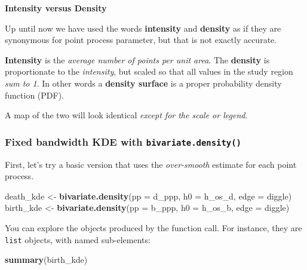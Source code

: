 \documentclass[
]{book}
\newenvironment{Shaded}{\begin{snugshade}}{\end{snugshade}}
\newcommand{\AttributeTok}[1]{\textcolor[rgb]{0.13,0.29,0.53}{#1}}
\newcommand{\FunctionTok}[1]{\textcolor[rgb]{0.13,0.29,0.53}{\textbf{#1}}}
\newcommand{\NormalTok}[1]{#1}
\newcommand{\OtherTok}[1]{\textcolor[rgb]{0.56,0.35,0.01}{#1}}
\newcommand{\StringTok}[1]{\textcolor[rgb]{0.31,0.60,0.02}{#1}}
\newenvironment{rmdnote}[1]
  {
  \begin{itemize}
  \renewcommand{\labelitemi}{
    \raisebox{-.7\height}[0pt][0pt]{
      {\setkeys{Gin}{width=3em,keepaspectratio}\texttt{[image: images/\#1]}}
    }
  }
  \setlength{\fboxsep}{1em}
  \begin{note}
  \item
  }
  {
  \end{note}
  \end{itemize}
  }
\begin{document}
\begin{rmdnote}{note}
\textbf{Intensity versus Density}

Up until now we have used the words \textbf{intensity} and \textbf{density} as if they are synonymous for point process parameter, but that is not exactly accurate.

\textbf{Intensity} is the \emph{average number of points per unit area}. The \textbf{density} is proportionate to the \emph{intensity}, but scaled so that all values in the study region \emph{sum to 1}. In other words a \textbf{density surface} is a proper probability density function (PDF).

A map of the two will look identical \emph{except for the scale or legend}.

\end{rmdnote}

\hypertarget{fixed-bandwidth-kde-with-bivariate.density}{%
\subsubsection{\texorpdfstring{Fixed bandwidth KDE with \texttt{bivariate.density()}}{Fixed bandwidth KDE with bivariate.density()}}\label{fixed-bandwidth-kde-with-bivariate.density}}

First, let's try a basic version that uses the \emph{over-smooth} estimate for each point process.

\begin{Shaded}
\begin{Highlighting}[]
\NormalTok{death\_kde }\OtherTok{\textless{}{-}} \FunctionTok{bivariate.density}\NormalTok{(}\AttributeTok{pp =}\NormalTok{ d\_ppp, }\AttributeTok{h0 =}\NormalTok{ h\_os\_d, }\AttributeTok{edge =} \StringTok{\textquotesingle{}diggle\textquotesingle{}}\NormalTok{)}
\NormalTok{birth\_kde }\OtherTok{\textless{}{-}} \FunctionTok{bivariate.density}\NormalTok{(}\AttributeTok{pp =}\NormalTok{ b\_ppp, }\AttributeTok{h0 =}\NormalTok{ h\_os\_b, }\AttributeTok{edge =} \StringTok{\textquotesingle{}diggle\textquotesingle{}}\NormalTok{)}
\end{Highlighting}
\end{Shaded}

You can explore the objects produced by the function call. For instance, they are \texttt{list} objects, with named sub-elements:

\begin{Shaded}
\begin{Highlighting}[]
\FunctionTok{summary}\NormalTok{(birth\_kde)}
\end{Highlighting}
\end{Shaded}
\end{document}
